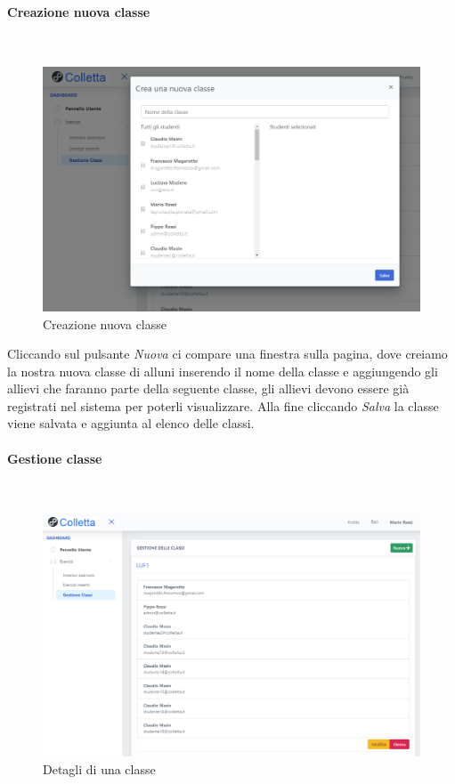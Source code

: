 \paragraph{Creazione nuova classe}\mbox{}\\         

\begin{figure}[H]
            	\centering
        		\includegraphics[width=17cm]{sez/img/insegnante/creanuovaclasse.PNG} 
            	\caption{Creazione nuova classe}\label{fig:1}
        	\end{figure}            	

Cliccando sul pulsante  \textit{Nuova} ci compare una finestra sulla pagina, dove creiamo la nostra nuova classe di alluni inserendo il nome della classe e aggiungendo gli allievi che faranno parte della seguente classe, gli allievi devono essere già registrati nel sistema per poterli visualizzare. Alla fine cliccando \textit{Salva} la classe viene salvata e aggiunta al elenco delle classi.
 
 \paragraph{Gestione classe}\mbox{}\\
 
 \begin{figure}[H]
            	\centering
        		\includegraphics[width=17cm]{sez/img/insegnante/gestioneclasse.PNG} 
            	\caption{Detagli di una classe}\label{fig:1}
        	\end{figure}
        	
